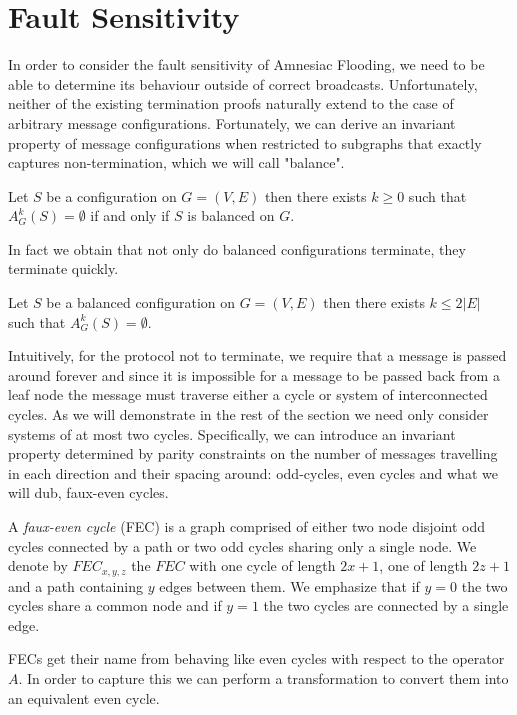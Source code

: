 \section{Fault Sensitivity}
\label{sec: faults}
    In order to consider the fault sensitivity of Amnesiac Flooding, we need to be able to determine its behaviour outside of correct broadcasts. 
    Unfortunately, neither of the existing termination proofs naturally extend to the case of arbitrary message configurations.
    Fortunately, we can derive an invariant property of message configurations when restricted to subgraphs that exactly captures non-termination, which we will call "balance". 
    \begin{theorem}
        \label{thm:balance}
        Let $S$ be a configuration on $G=(V,E)$ then there exists $k\geq 0$ such that $A^{k}_{G}(S)=\emptyset$ if and only if $S$ is balanced on $G$.
    \end{theorem}
    In fact we obtain that not only do balanced configurations terminate, they terminate quickly.
    \begin{corollary}
    \label{corr: balance is fast}
        Let $S$ be a balanced configuration on $G=(V,E)$ then there exists $k\leq 2|E|$ such that $A^{k}_G(S)=\emptyset$.
    \end{corollary}
    Intuitively, for the protocol not to terminate, we require that a message is passed around forever and since it is impossible for a message to be passed back from a leaf node the message must traverse either a cycle or system of interconnected cycles. 
    As we will demonstrate in the rest of the section we need only consider systems of at most two cycles. Specifically, we can introduce an invariant property determined by parity constraints on the number of messages travelling in each direction and their spacing around: odd-cycles, even cycles and what we will dub, faux-even cycles.
    \begin{definition}
        A \emph{faux-even cycle} (FEC) is a graph comprised of either two node disjoint odd cycles connected by a path or two odd cycles sharing only a single node. We denote by $FEC_{x,y,z}$ the $FEC$ with one cycle of length $2x+1$, one of length $2z+1$ and a path containing $y$ edges between them.
        We emphasize that if $y=0$ the two cycles share a common node and if $y=1$ the two cycles are connected by a single edge.
    \end{definition}
    FECs get their name from behaving like even cycles with respect to the operator $A$. In order to capture this we can perform a transformation to convert them into an equivalent even cycle.
